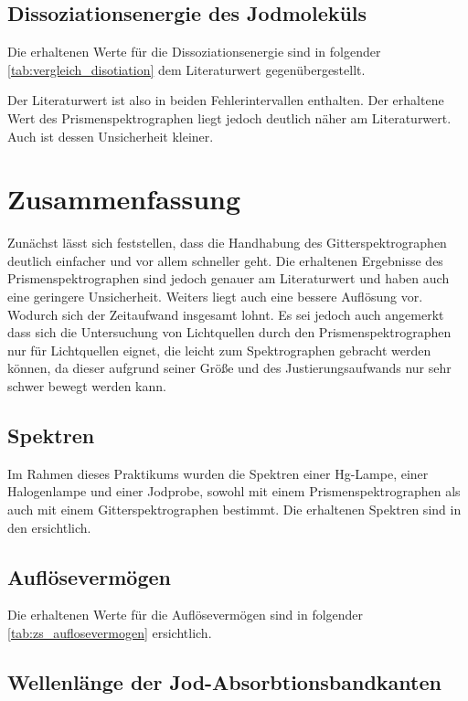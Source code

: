 \documentclass[12pt,english,ngerman]{scrartcl}
\begin{document}
\subsection{Dissoziationsenergie des Jodmoleküls}

Die erhaltenen Werte für die Dissoziationsenergie sind in folgender
\autoref{tab:vergleich_disotiation} dem Literaturwert gegenübergestellt.

Der Literaturwert ist also in beiden Fehlerintervallen enthalten. Der erhaltene
Wert des Prismenspektrographen liegt jedoch deutlich näher am Literaturwert.
Auch ist dessen Unsicherheit kleiner.

\section{Zusammenfassung}\label{sec:zs}
Zunächst lässt sich feststellen, dass die Handhabung des Gitterspektrographen
deutlich einfacher und vor allem schneller geht. Die erhaltenen Ergebnisse des
Prismenspektrographen sind jedoch genauer am Literaturwert und haben auch eine
geringere Unsicherheit. Weiters liegt auch eine bessere Auflösung vor. Wodurch
sich der Zeitaufwand insgesamt lohnt. Es sei jedoch auch angemerkt dass sich
die Untersuchung von Lichtquellen durch den Prismenspektrographen nur für
Lichtquellen eignet, die leicht zum Spektrographen gebracht werden können, da
dieser aufgrund seiner Größe und des Justierungsaufwands nur sehr schwer bewegt
werden kann.

\subsection{Spektren}

Im Rahmen dieses Praktikums wurden die Spektren einer Hg-Lampe, einer
Halogenlampe und einer Jodprobe, sowohl mit einem Prismenspektrographen als
auch mit einem Gitterspektrographen bestimmt. Die erhaltenen Spektren sind in
den 
ersichtlich.

\subsection{Auflösevermögen}

Die erhaltenen Werte für die Auflösevermögen sind in folgender
\autoref{tab:zs_auflosevermogen} ersichtlich.

\subsection{Wellenlänge der Jod-Absorbtionsbandkanten}
\end{document}
